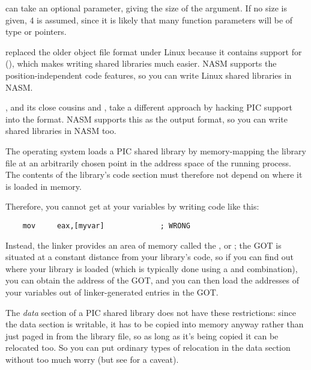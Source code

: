  can take an optional parameter, giving the size of the
argument. If no size is given, 4 is assumed, since it is likely that
many function parameters will be of type  or pointers.


 replaced the older  object file format under Linux
because it contains support for 
(), which makes writing shared libraries much easier. NASM
supports the  position-independent code features, so you can
write Linux  shared libraries in NASM.

, and its close cousins  and
, take a different approach by hacking PIC support
into the  format. NASM supports this as the 
output format, so you can write  shared libraries in
NASM too.

The operating system loads a PIC shared library by memory-mapping
the library file at an arbitrarily chosen point in the address space
of the running process. The contents of the library's code section
must therefore not depend on where it is loaded in memory.

Therefore, you cannot get at your variables by writing code like
this:

\begin{lstlisting}
    mov     eax,[myvar]             ; WRONG
\end{lstlisting}

Instead, the linker provides an area of memory called the
, or ; the GOT is situated
at a constant distance from your library's code, so if you can find out
where your library is loaded (which is typically done using a 
and  combination), you can obtain the address of the GOT, and
you can then load the addresses of your variables out of linker-generated
entries in the GOT.

The \emph{data} section of a PIC shared library does not have these
restrictions: since the data section is writable, it has to be
copied into memory anyway rather than just paged in from the library
file, so as long as it's being copied it can be relocated too. So
you can put ordinary types of relocation in the data section without
too much worry (but see  for a caveat).

